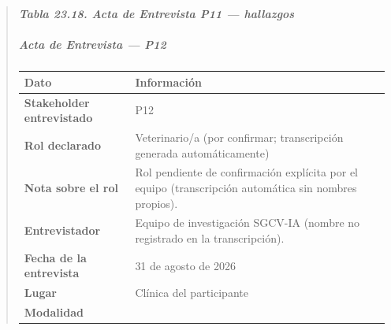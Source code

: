\documentclass[
]{article}
\newcounter{none} %
\begin{document}
\begin{quote}
\protect{}\label{_bookmark_P11_hallazgos}{}\emph{\textbf{Tabla 23.18. Acta de Entrevista P11 --- hallazgos}}

\subparagraph{Acta de Entrevista --- P12}\label{acta-entrevista-p12}

{\def\LTcaptype{none} %
\begin{longtable}[]{|
  >{\raggedright\arraybackslash}p{}|
  >{\raggedright\arraybackslash}p{}|}
\hline
\begin{minipage}[b]{\linewidth}\centering
\textbf{Dato}
\end{minipage} & \begin{minipage}[b]{\linewidth}\centering
\textbf{Información}
\end{minipage} \\
\hline
\endhead
\hline
\endlastfoot
\textbf{Stakeholder entrevistado} & \begin{minipage}[t]{\linewidth}\raggedright
P12
\end{minipage} \\
\hline
\textbf{Rol declarado} & \begin{minipage}[t]{\linewidth}\raggedright
Veterinario/a (por confirmar; transcripción generada automáticamente)
\end{minipage} \\
\hline
\textbf{Nota sobre el rol} & \begin{minipage}[t]{\linewidth}\raggedright
Rol pendiente de confirmación explícita por el equipo (transcripción automática sin nombres propios).
\end{minipage} \\
\hline
\textbf{Entrevistador} & \begin{minipage}[t]{\linewidth}\raggedright
Equipo de investigación SGCV-IA (nombre no registrado en la transcripción).
\end{minipage} \\
\hline
\textbf{Fecha de la entrevista} & \begin{minipage}[t]{\linewidth}\raggedright
31 de agosto de 2026
\end{minipage} \\
\hline
\textbf{Lugar} & \begin{minipage}[t]{\linewidth}\raggedright
Clínica del participante
\end{minipage} \\
\hline
\textbf{Modalidad} & \begin{minipage}[t]{\linewidth}\raggedright

\end{minipage}
\end{longtable}}
\end{quote}
\end{document}
